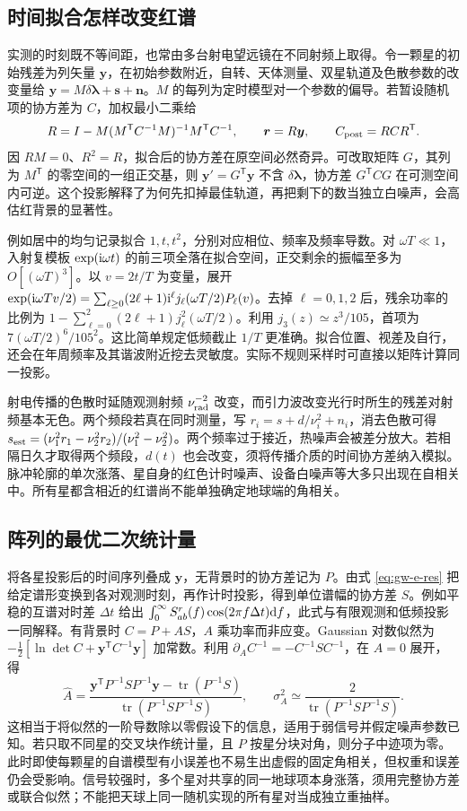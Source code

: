 \subsection{时间拟合怎样改变红谱}
实测的时刻既不等间距，也常由多台射电望远镜在不同射频上取得。令一颗星的初始残差为列矢量 $\bm y$，在初始参数附近，自转、天体测量、双星轨道及色散参数的改变量给 $\bm y=M\delta\bm\lambda+\bm s+\bm n$。$M$ 的每列为定时模型对一个参数的偏导。若暂设随机项的协方差为 $C$，加权最小二乘给
\[
 R=I-M(M^{\mathsf T}C^{-1}M)^{-1}M^{\mathsf T}C^{-1},\qquad
 \bm r=R\bm y,\qquad C_{\rm post}=R C R^{\mathsf T}.
\]
因 $RM=0$、$R^2=R$，拟合后的协方差在原空间必然奇异。可改取矩阵 $G$，其列为 $M^{\mathsf T}$ 的零空间的一组正交基，则 $\bm y'=G^{\mathsf T}\bm y$ 不含 $\delta\bm\lambda$，协方差 $G^{\mathsf T}C G$ 在可测空间内可逆。这个投影解释了为何先扣掉最佳轨道，再把剩下的数当独立白噪声，会高估红背景的显著性。

例如居中的均匀记录拟合 $1,t,t^2$，分别对应相位、频率及频率导数。对 $\omega T\ll1$，入射复模板 $\exp(\mathrm{i}\omega t)$ 的前三项全落在拟合空间，正交剩余的振幅至多为 $O[(\omega T)^3]$。以 $v=2t/T$ 为变量，展开 $\exp(\mathrm{i}\omega Tv/2)=\sum_{\ell\ge0}(2\ell+1)\mathrm{i}^\ell j_\ell(\omega T/2)P_\ell(v)$。去掉 $\ell=0,1,2$ 后，残余功率的比例为 $1-\sum_{\ell=0}^2(2\ell+1)j_\ell^2(\omega T/2)$。利用 $j_3(z)\simeq z^3/105$，首项为 $7(\omega T/2)^6/105^2$。这比简单规定低频截止 $1/T$ 更准确。拟合位置、视差及自行，还会在年周频率及其谐波附近挖去灵敏度。实际不规则采样时可直接以矩阵计算同一投影。

射电传播的色散时延随观测射频 $\nu_{\rm rad}^{-2}$ 改变，而引力波改变光行时所生的残差对射频基本无色。两个频段若真在同时测量，写 $r_i=s+d/\nu_i^2+n_i$，消去色散可得 $s_{\rm est}=(\nu_1^2r_1-\nu_2^2r_2)/(\nu_1^2-\nu_2^2)$。两个频率过于接近，热噪声会被差分放大。若相隔日久才取得两个频段，$d(t)$ 也会改变，须将传播介质的时间协方差纳入模拟。脉冲轮廓的单次涨落、星自身的红色计时噪声、设备白噪声等大多只出现在自相关中。所有星都含相近的红谱尚不能单独确定地球端的角相关。

\subsection{阵列的最优二次统计量}
将各星投影后的时间序列叠成 $\bm y$，无背景时的协方差记为 $P$。由式 \eqref{eq:gw-e-res} 把给定谱形变换到各对观测时刻，再作计时投影，得到单位谱幅的协方差 $S$。例如平稳的互谱对时差 $\Delta t$ 给出 $\int_0^\infty S^r_{ab}(f)\cos(2\pi f\Delta t)\dd f$，此式与有限观测和低频投影一同解释。有背景时 $C=P+A S$，$A$ 乘功率而非应变。Gaussian 对数似然为 $-\tfrac12[\ln\det C+\bm y^{\mathsf T}C^{-1}\bm y]$ 加常数。利用 $\partial_A C^{-1}=-C^{-1}SC^{-1}$，在 $A=0$ 展开，得
\[
 \widehat A=
 \frac{\bm y^{\mathsf T}P^{-1}S P^{-1}\bm y-
             \operatorname{tr}(P^{-1}S)}{\operatorname{tr}(P^{-1}S P^{-1}S)},\qquad
 \sigma_A^2\simeq \frac{2}{\operatorname{tr}(P^{-1}S P^{-1}S)} .
\]
这相当于将似然的一阶导数除以零假设下的信息，适用于弱信号并假定噪声参数已知。若只取不同星的交叉块作统计量，且 $P$ 按星分块对角，则分子中迹项为零。此时即使每颗星的自谱模型有小误差也不易生出虚假的固定角相关，但权重和误差仍会受影响。信号较强时，多个星对共享的同一地球项本身涨落，须用完整协方差或联合似然；不能把天球上同一随机实现的所有星对当成独立重抽样。

